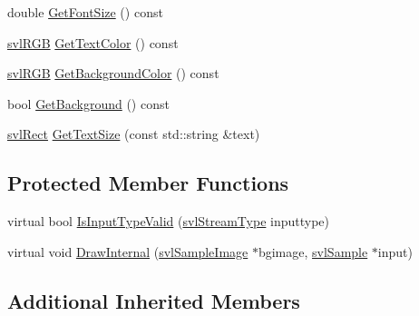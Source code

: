 \begin{DoxyCompactItemize}
\item 
double \hyperlink{classsvl_overlay_text_abfd1624afcdf0805c0a28409b4327cb7}{Get\-Font\-Size} () const 
\item 
\hyperlink{structsvl_r_g_b}{svl\-R\-G\-B} \hyperlink{classsvl_overlay_text_a13dc7a6a8b081dae77e0e1e1ac68aed5}{Get\-Text\-Color} () const 
\item 
\hyperlink{structsvl_r_g_b}{svl\-R\-G\-B} \hyperlink{classsvl_overlay_text_ad3fd961cd702bfa7b431d7053fa77fe8}{Get\-Background\-Color} () const 
\item 
bool \hyperlink{classsvl_overlay_text_a23c23eca402d5e1e443ef6dde4210ef1}{Get\-Background} () const 
\item 
\hyperlink{structsvl_rect}{svl\-Rect} \hyperlink{classsvl_overlay_text_acc374695dc5ad62828753a0e80715654}{Get\-Text\-Size} (const std\-::string \&text)
\end{DoxyCompactItemize}
\subsection*{Protected Member Functions}
\begin{DoxyCompactItemize}
\item 
virtual bool \hyperlink{classsvl_overlay_text_a2320174f998047f8a29b0688ab1782b8}{Is\-Input\-Type\-Valid} (\hyperlink{svl_definitions_8h_aa00696d338a58db361335a01fd11e122}{svl\-Stream\-Type} inputtype)
\item 
virtual void \hyperlink{classsvl_overlay_text_a249b03908d6fdbaf41399e3d6af8b618}{Draw\-Internal} (\hyperlink{classsvl_sample_image}{svl\-Sample\-Image} $\ast$bgimage, \hyperlink{classsvl_sample}{svl\-Sample} $\ast$input)
\end{DoxyCompactItemize}
\subsection*{Additional Inherited Members}


